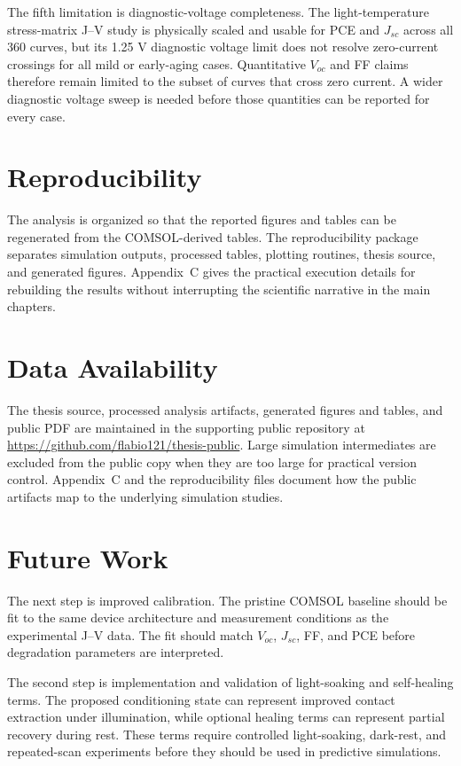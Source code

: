 The fifth limitation is diagnostic-voltage completeness. The light-temperature
stress-matrix J--V study is physically scaled and usable for PCE and $J_{sc}$
across all 360 curves, but its 1.25 V diagnostic voltage limit does not resolve
zero-current crossings for all mild or early-aging cases.
Quantitative $V_{oc}$ and FF claims therefore remain limited to the subset of
curves that cross zero current. A wider diagnostic voltage sweep is needed
before those quantities can be reported for every case.

\section{Reproducibility}

The analysis is organized so that the reported figures and tables can be
regenerated from the COMSOL-derived tables. The reproducibility package
separates simulation outputs, processed tables, plotting routines, thesis
source, and generated figures. Appendix~C gives the practical execution
details for rebuilding the results without interrupting the scientific
narrative in the main chapters.

\section{Data Availability}

The thesis source, processed analysis artifacts, generated figures and tables,
and public PDF are maintained in the supporting public repository at
\url{https://github.com/flabio121/thesis-public}. Large simulation
intermediates are excluded from the public copy when they are too large for
practical version control. Appendix~C and the reproducibility files document
how the public artifacts map to the underlying simulation studies.

\section{Future Work}

The next step is improved calibration. The pristine COMSOL
baseline should be fit to the same device architecture and measurement
conditions as the experimental J--V data. The fit should match $V_{oc}$,
$J_{sc}$, FF, and PCE before degradation parameters are interpreted.

The second step is implementation and validation of light-soaking and
self-healing terms. The proposed conditioning state can represent improved
contact extraction under illumination, while optional healing terms can
represent partial recovery during rest. These terms require controlled
light-soaking, dark-rest, and repeated-scan experiments before they should be
used in predictive simulations.

